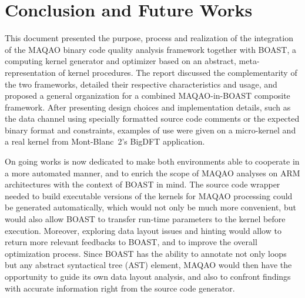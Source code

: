 \documentclass[11pt, a4paper, twoside]{montblanc2}
\begin{document}
\section{Conclusion and Future Works}\label{sec:conclusion}

This document presented the purpose, process and realization of the integration 
of the MAQAO binary code quality analysis framework together with BOAST, a 
computing kernel generator and optimizer based on an abstract, 
meta-representation of kernel procedures. The report discussed the 
complementarity of the two frameworks, detailed their respective characteristics 
and usage, and proposed a general organization for a combined MAQAO-in-BOAST 
composite framework. After presenting design choices and implementation details, 
such as the data channel using specially formatted source code comments or the 
expected binary format and constraints, examples of use were given on a 
micro-kernel and a real kernel from Mont-Blanc~2's BigDFT application.

On going works is now dedicated to make both environments able to cooperate in a 
more automated manner, and to enrich the scope of MAQAO analyses on ARM 
architectures with the context of BOAST in mind. The source code wrapper needed 
to build executable versions of the kernels for MAQAO processing could be 
generated automatically, which would not only be much more convenient, but would also 
allow BOAST to transfer run-time parameters to the kernel before execution. Moreover, 
exploring data layout issues and hinting would allow to return more relevant feedbacks to BOAST, and to improve the 
overall optimization process. Since BOAST has the ability to annotate not only 
loops but any abstract syntactical tree (AST) element, MAQAO would then have the 
opportunity to guide its own data layout analysis, and also to confront findings 
with accurate information right from the source code generator.



\end{document}
